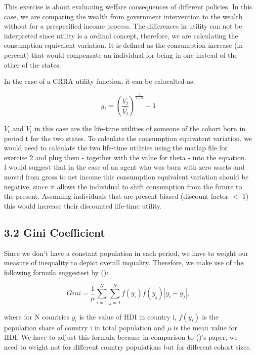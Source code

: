 \documentclass[12pt,a4paper]{article}
\begin{document}
This exercise is about evaluating welfare consequences of different policies. In this case, we are comparing the wealth from government intervention to the wealth without for a prespecified income process. The differences in utility can not be interpreted since utility is a ordinal concept, therefore, we are calculating the consumption equivalent variation. It is defined as the consumption increase (in percent) that would compensate an individual for being in one instead of the other of the states. 

In the case of a CRRA utility function, it can be calucalted as: 

$$ g_t = ( \frac{V_t}{\bar{V_t}})^\frac{1}{1-\theta}-1 $$

$V_t$ and $\bar{V_t}$ in this case are the life-time utilities of someone of the cohort born in period t for the two states. To calculate the consumption equivatent variation, we would need to calculate the two life-time utilities using the matlap file for exercise 2 and plug them - together with the value for theta - into the equation. \\
I would suggest that in the case of an agent who was born with zero assets and moved from gross to net income this consumption equivalent variation should be negative, since it allows the individual to shift consumption from the future to the present. Assuming individuals that are present-biased (discount factor $<$ 1) this would increase their discounted life-time utility.

\subsection*{3.2 Gini Coefficient}

Since we don't have a constant population in each period, we have to weight our measure of inequality to depict overall inquality. Therefore, we make use of the following formula suggestest by \citeauthor{noorbakhsh2007international}
(\citeyear{noorbakhsh2007international}):

$$ Gini = \frac{1}{\mu} \sum_{i=1}^N \sum_{j=1}^N f(y_i)f(y_j)|y_i - y_j|, $$

where for N countries $y_i$ is the value of HDI in country i, $f(y_i)$ is the population share of country i in total
population and $\mu$ is the mean value for HDI. We have to adjust this formula because in comparison to \citeauthor{noorbakhsh2007international}
(\citeyear{noorbakhsh2007international})'s paper, we need to weight not for different country populations but for different cohort sizes. \\
\end{document}
